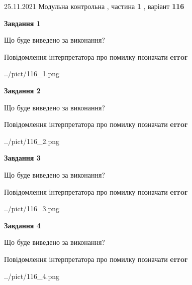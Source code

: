 \documentclass[10pt, ukrainian]{article}
\begin{document}
{25.11.2021 Модульна контрольна , частина \textbf { 1 }, варіант  \No \textbf { 116 }\par}
{
\begin {large}

{\begin {center}\textbf{Завдання 1}\end {center}}\par
Що буде виведено за виконання? \par
Повідомлення інтерпретатора про помилку позначати \textbf{error}

\begin{center}
	{../pict/116_1.png}
\end{center}
\newpage

{\begin {center}\textbf{Завдання 2}\end {center}}\par
Що буде виведено за виконання? \par
Повідомлення інтерпретатора про помилку позначати \textbf{error}

\begin{center}
	{../pict/116_2.png}
\end{center}
\newpage

{\begin {center}\textbf{Завдання 3}\end {center}}\par
Що буде виведено за виконання? \par
Повідомлення інтерпретатора про помилку позначати \textbf{error}

\begin{center}
	{../pict/116_3.png}
\end{center}
\newpage

{\begin {center}\textbf{Завдання 4}\end {center}}\par
Що буде виведено за виконання? \par
Повідомлення інтерпретатора про помилку позначати \textbf{error}

\begin{center}
	{../pict/116_4.png}
\end{center}
\newpage


\end{large}}
\end{document}

